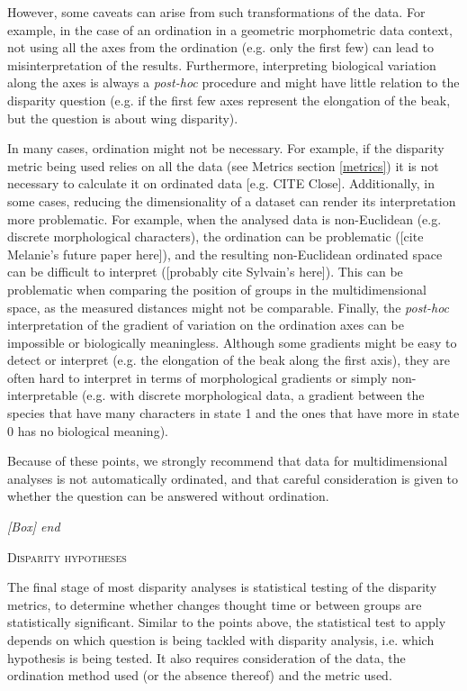 \documentclass[12pt,letterpaper]{article}
\renewcommand{\section}[1]{%
\bigskip
\begin{center}
\begin{Large}
\normalfont\scshape #1
\medskip
\end{Large}
\end{center}}
\renewcommand{\subsection}[1]{%
\bigskip
\begin{center}
\begin{large}
\normalfont\itshape #1
\end{large}
\end{center}}
\begin{document}
However, some caveats can arise from such transformations of the data.
For example, in the case of an ordination in a geometric morphometric data context, not using all the axes from the ordination (e.g. only the first few) can lead to misinterpretation of the results.
Furthermore, interpreting biological variation along the axes is always a \textit{post-hoc} procedure and might have little relation to the disparity question (e.g. if the first few axes represent the elongation of the beak, but the question is about wing disparity).

In many cases, ordination might not be necessary.
For example, if the disparity metric being used relies on all the data (see Metrics section \ref{metrics}) it is not necessary to calculate it on ordinated data [e.g. CITE Close].
Additionally, in some cases, reducing the dimensionality of a dataset can render its interpretation more problematic.
For example, when the analysed data is non-Euclidean (e.g. discrete morphological characters), the ordination can be problematic ([cite Melanie's future paper here]), and the resulting non-Euclidean ordinated space can be difficult to interpret ([probably cite Sylvain's here]).
This can be problematic when comparing the position of groups in the multidimensional space, as the measured distances might not be comparable.
Finally, the \textit{post-hoc} interpretation of the gradient of variation on the ordination axes can be impossible or biologically meaningless.
Although some gradients might be easy to detect or interpret (e.g. the elongation of the beak along the first axis), they are often hard to interpret in terms of morphological gradients or simply non-interpretable (e.g. with discrete morphological data, a gradient between the species that have many characters in state 1 and the ones that have more in state 0 has no biological meaning).

Because of these points, we strongly recommend that data for multidimensional analyses is not automatically ordinated, and that careful consideration is given to whether the question can be answered without ordination.
\subsection{[Box] end}




\section{Disparity hypotheses}
The final stage of most disparity analyses is statistical testing of the disparity metrics, to determine whether changes thought time or between groups are statistically significant. 
Similar to the points above, the statistical test to apply depends on which question is being tackled with disparity analysis, i.e. which hypothesis is being tested.
It also requires consideration of the data, the ordination method used (or the absence thereof) and the metric used.
\end{document}
